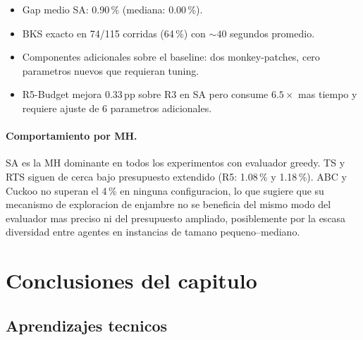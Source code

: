 \begin{itemize}
\item Gap medio SA: 0.90\,\% (mediana: 0.00\,\%).
\item BKS exacto en 74/115 corridas (64\,\%) con $\sim 40$ segundos promedio.
\item Componentes adicionales sobre el baseline: dos monkey-patches,
      cero parametros nuevos que requieran tuning.
\item R5-Budget mejora 0.33\,pp sobre R3 en SA pero consume $6.5\times$
      mas tiempo y requiere ajuste de 6 parametros adicionales.
\end{itemize}

\paragraph{Comportamiento por MH.}
SA es la MH dominante en todos los experimentos con evaluador greedy.
TS y RTS siguen de cerca bajo presupuesto extendido (R5: 1.08\,\% y
1.18\,\%). ABC y Cuckoo no superan el 4\,\% en ninguna configuracion,
lo que sugiere que su mecanismo de exploracion de enjambre no se
beneficia del mismo modo del evaluador mas preciso ni del presupuesto
ampliado, posiblemente por la escasa diversidad entre agentes en
instancias de tamano pequeno--mediano.

\section{Conclusiones del capitulo}
\label{sec:conclusiones}

\subsection{Aprendizajes tecnicos}


